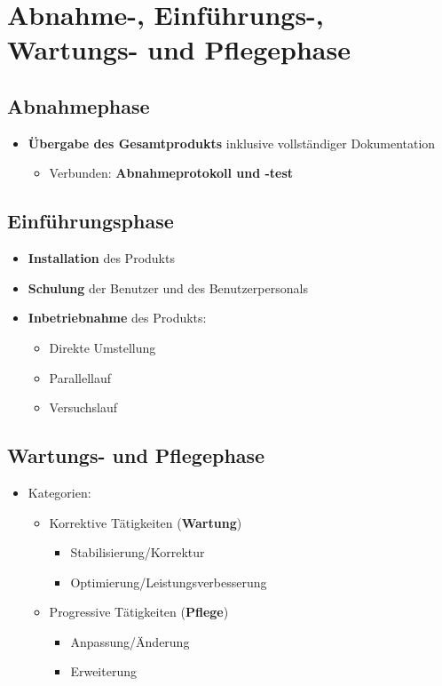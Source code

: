 \section{Abnahme-, Einführungs-, Wartungs- und Pflegephase}
	
	\subsection{Abnahmephase}
	
		\begin{itemize}
			\item \textbf{Übergabe des Gesamtprodukts} inklusive vollständiger Dokumentation
			\begin{itemize}
				\item Verbunden: \textbf{Abnahmeprotokoll und -test}
			\end{itemize}
		\end{itemize}
		
	\subsection{Einführungsphase}
	
		\begin{itemize}
			\item \textbf{Installation} des Produkts
			\item \textbf{Schulung} der Benutzer und des Benutzerpersonals
			\item \textbf{Inbetriebnahme} des Produkts:
			\begin{itemize}
				\item Direkte Umstellung
				\item Parallellauf
				\item Versuchslauf
			\end{itemize}
		\end{itemize}
			
	\subsection{Wartungs- und Pflegephase}
	
		\begin{itemize}
			\item Kategorien:
			\begin{itemize}
				\item Korrektive Tätigkeiten (\textbf{Wartung})
				\begin{itemize}
					\item Stabilisierung/Korrektur
					\item Optimierung/Leistungsverbesserung
				\end{itemize}
				\item Progressive Tätigkeiten (\textbf{Pflege})
				\begin{itemize}
					\item Anpassung/Änderung
					\item Erweiterung
				\end{itemize}
			\end{itemize}
		\end{itemize}